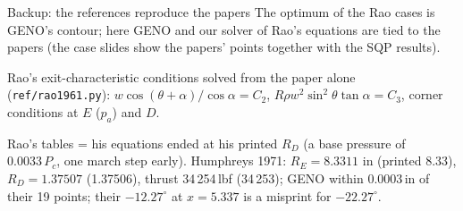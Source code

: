 \documentclass[aspectratio=169,10pt]{beamer}
\begin{document}
\begin{frame}{Backup: the references reproduce the papers}
\footnotesize
The optimum of the Rao cases is GENO's contour; here GENO and our solver of Rao's equations are tied to the papers
(the case slides show the papers' points together with the SQP results).

\footnotesize
Rao's exit-characteristic conditions solved from the paper alone (\texttt{ref/rao1961.py}):
$w\cos(\theta+\alpha)/\cos\alpha=C_2$, $R\rho w^2\sin^2\theta\tan\alpha=C_3$, corner conditions at $E$ ($p_a$) and $D$.

\smallskip
{}

\smallskip
Rao's tables = his equations ended at his printed $R_D$ (a base pressure of $0.0033\,P_c$, one march step early).
Humphreys 1971: $R_E=8.3311$ in (printed 8.33), $R_D=1.37507$ (1.37506), thrust 34\,254\,lbf (34\,253); GENO within
0.0003\,in of their 19 points; their $-12.27^\circ$ at $x=5.337$ is a misprint for $-22.27^\circ$.

\end{frame}
\end{document}

